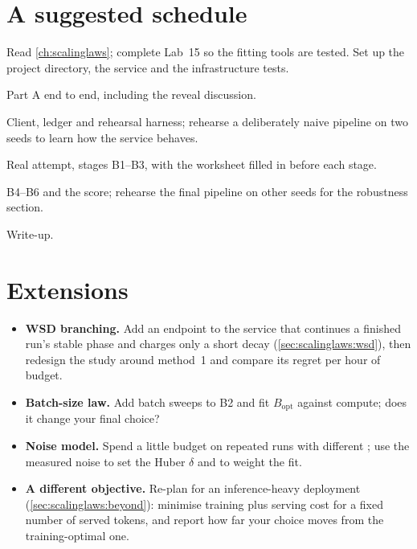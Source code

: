 \section{A suggested schedule}\label{sec:proj3:schedule}

\begin{description}[leftmargin=2.6cm, style=nextline]
\item[Day 1] Read \cref{ch:scalinglaws}; complete Lab~15 so the fitting tools are tested. Set up
      the project directory, the service and the infrastructure tests.
\item[Day 2] Part A end to end, including the reveal discussion.
\item[Day 3] Client, ledger and rehearsal harness; rehearse a deliberately naive pipeline on two
      seeds to learn how the service behaves.
\item[Day 4] Real attempt, stages B1--B3, with the worksheet filled in before each stage.
\item[Day 5] B4--B6 and the score; rehearse the final pipeline on other seeds for the
      robustness section.
\item[Day 6] Write-up.
\end{description}

\section{Extensions}\label{sec:proj3:extensions}
\begin{itemize}
\item \textbf{WSD branching.} Add an endpoint to the service that continues a finished run's
      stable phase and charges only a short decay (\cref{sec:scalinglaws:wsd}), then redesign the
      study around method~1 and compare its regret per hour of budget.
\item \textbf{Batch-size law.} Add batch sweeps to B2 and fit $B_{\text{opt}}$ against compute;
      does it change your final choice?
\item \textbf{Noise model.} Spend a little budget on repeated runs with different
      ; use the measured noise to set the Huber $\delta$ and to weight the fit.
\item \textbf{A different objective.} Re-plan for an inference-heavy deployment
      (\cref{sec:scalinglaws:beyond}): minimise training plus serving cost for a fixed number of
      served tokens, and report how far your choice moves from the training-optimal one.
\end{itemize}


